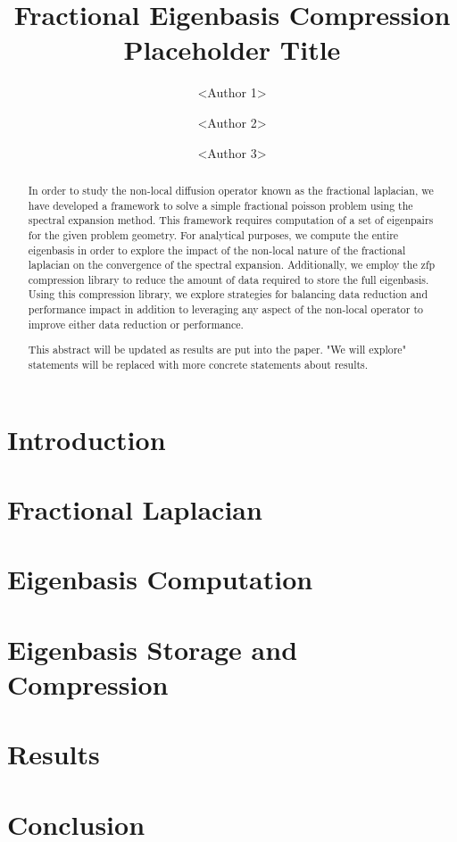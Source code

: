 \documentclass[sigconf]{acmart}
\begin{document}
	
	\title{Fractional Eigenbasis Compression Placeholder Title}
	
	\author{<Author 1>}
	
	\author{<Author 2>}
	
	\author{<Author 3>}
	
	\begin{abstract}
		In order to study the non-local diffusion operator known as the fractional laplacian, we have developed a framework to solve a simple fractional poisson problem using the spectral expansion method. This framework requires computation of a set of eigenpairs for the given problem geometry. For analytical purposes, we compute the entire eigenbasis in order to explore the impact of the non-local nature of the fractional laplacian on the convergence of the spectral expansion. Additionally, we employ the zfp compression library to reduce the amount of data required to store the full eigenbasis. Using this compression library, we explore strategies for balancing data reduction and performance impact in addition to leveraging any aspect of the non-local operator to improve either data reduction or performance.
		
		{\color{blue} This abstract will be updated as results are put into the paper. "We will explore" statements will be replaced with more concrete statements about results.}
	\end{abstract}
	
	\maketitle
	
	\section{Introduction}
	
	
	\section{Fractional Laplacian}
	
	
	\section{Eigenbasis Computation}
	
	
	\section{Eigenbasis Storage and Compression}
	
	
	\section{Results}
	
	
	\section{Conclusion}
	
	
	
	
	
\end{document}
